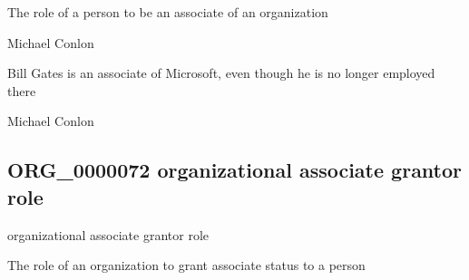 \documentclass[letterpaper,10pt,english]{sphinxmanual}
\begin{document}
\begin{sphinxShadowBox}

\sphinxAtStartPar
The role of a person to be an associate of an organization
\end{sphinxShadowBox}

\begin{sphinxShadowBox}

\sphinxAtStartPar
Michael Conlon 
\end{sphinxShadowBox}

\begin{sphinxShadowBox}

\sphinxAtStartPar
Bill Gates is an associate of Microsoft, even though he is no longer employed there
\end{sphinxShadowBox}

\begin{sphinxShadowBox}

\sphinxAtStartPar
Michael Conlon 
\end{sphinxShadowBox}
\begin{quote}

\ignorespaces \end{quote}


\subsection{ORG\_0000072 \sphinxhyphen{} organizational associate grantor role}
\label{\detokenize{doc-ORG_0000072:org-0000072-organizational-associate-grantor-role}}\label{\detokenize{doc-ORG_0000072:index-0}}\label{\detokenize{doc-ORG_0000072::doc}}
\begin{sphinxShadowBox}

\sphinxAtStartPar
organizational associate grantor role
\end{sphinxShadowBox}

\begin{sphinxShadowBox}

\sphinxAtStartPar
The role of an organization to grant associate status to a person
\end{sphinxShadowBox}
\end{document}
